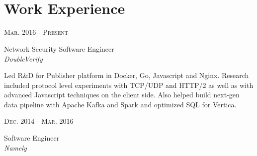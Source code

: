 \documentclass[10pt]{article} %
\begin{document}
\color{text1} %


\par{\\ %
\par{}\\
	

\begin{minipage}[t]{0.5\textwidth} %
\vspace{0pt} %
	

\section{Work Experience} 


{\raggedleft\textsc{Mar. 2016 - Present}\par}
{\raggedright\large Network Security Software Engineer\\
\textit{DoubleVerify}\\[5pt]}

\small{Led R\&D for Publisher platform in Docker, Go, Javascript and Nginx. 
  Research included protocol level experiments with TCP/UDP and HTTP/2 as well 
  as with advanced Javascript techniques on the client side. Also helped build 
  next-gen data pipeline with Apache Kafka and Spark and optimized SQL for 
  Vertica.}\\


{\raggedleft\textsc{Dec. 2014 - Mar. 2016}\par}
{\raggedright\large Software Engineer\\
\textit{Namely}\\[5pt]}


\end{minipage}}
\end{document}
